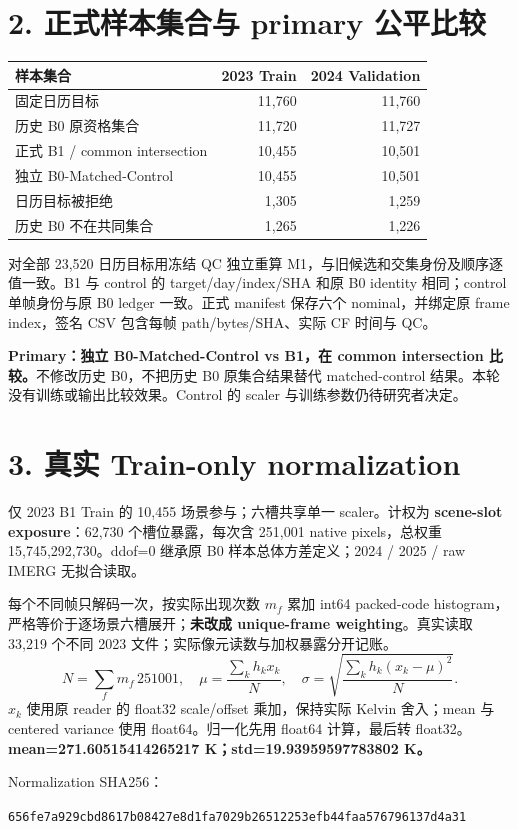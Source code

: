 \documentclass[11pt,a4paper,fontset=windows]{ctexart}
\begin{document}
\section*{2. 正式样本集合与 primary 公平比较}
\begin{center}\small\begin{tabular}{lrr}\toprule
样本集合 & 2023 Train & 2024 Validation\\\midrule
固定日历目标 & 11,760 & 11,760\\
历史 B0 原资格集合 & 11,720 & 11,727\\
正式 B1 / common intersection & 10,455 & 10,501\\
独立 B0-Matched-Control & 10,455 & 10,501\\
日历目标被拒绝 & 1,305 & 1,259\\
历史 B0 不在共同集合 & 1,265 & 1,226\\\bottomrule
\end{tabular}\end{center}
对全部 23,520 日历目标用冻结 QC 独立重算 M1，与旧候选和交集身份及顺序逐值一致。B1 与 control 的 target/day/index/SHA 和原 B0 identity 相同；control 单帧身份与原 B0 ledger 一致。正式 manifest 保存六个 nominal，并绑定原 frame index，签名 CSV 包含每帧 path/bytes/SHA、实际 CF 时间与 QC。

\textbf{Primary：独立 B0-Matched-Control vs B1，在 common intersection 比较。}不修改历史 B0，不把历史 B0 原集合结果替代 matched-control 结果。本轮没有训练或输出比较效果。Control 的 scaler 与训练参数仍待研究者决定。
\section*{3. 真实 Train-only normalization}
仅 2023 B1 Train 的 10,455 场景参与；六槽共享单一 scaler。计权为 \textbf{scene-slot exposure}：62,730 个槽位暴露，每次含 251,001 native pixels，总权重 15,745,292,730。ddof=0 继承原 B0 样本总体方差定义；2024 / 2025 / raw IMERG 无拟合读取。

每个不同帧只解码一次，按实际出现次数 $m_f$ 累加 int64 packed-code histogram，严格等价于逐场景六槽展开；\textbf{未改成 unique-frame weighting}。真实读取 33,219 个不同 2023 文件；实际像元读数与加权暴露分开记账。
\[
N=\sum_f m_f\,251001,\quad
\mu=\frac{\sum_k h_k x_k}{N},\quad
\sigma=\sqrt{\frac{\sum_k h_k(x_k-\mu)^2}{N}}.
\]
$x_k$ 使用原 reader 的 float32 scale/offset 乘加，保持实际 Kelvin 舍入；mean 与 centered variance 使用 float64。归一化先用 float64 计算，最后转 float32。
\textbf{mean=271.60515414265217 K；std=19.93959597783802 K。}\par
Normalization SHA256：\par{\footnotesize\texttt{656fe7a929cbd8617b08427e8d1fa7029b26512253efb44faa576796137d4a31}}
\end{document}
